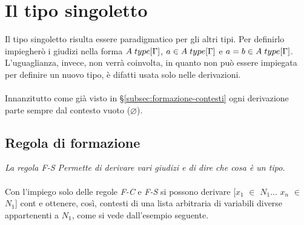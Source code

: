 \documentclass[10pt,a4paper, italian]{book}
\begin{document}
\section{Il tipo singoletto}
\label{sec:tipo-singoletto}
Il tipo singoletto risulta essere paradigmatico per gli altri tipi. Per definirlo impiegher\`o i giudizi nella forma $A\hspace{0.1cm}type[\Gamma]$, $a \in A\hspace{0.1cm}type[\Gamma]$ e $a = b \in A\hspace{0.1cm}type[\Gamma]$. L'uguaglianza, invece, non verr\`a coinvolta, in quanto non pu\`o essere impiegata per definire un nuovo tipo, \`e difatti usata solo nelle derivazioni.\\\\
Innanzitutto come gi\`a visto in \S\ref{subsec:formazione-contesti} ogni derivazione parte sempre dal contesto vuoto ($\varnothing$).
\begin{prooftree}
\end{prooftree}

\subsection{Regola di formazione}
\label{subsec:formazione}
\begin{prooftree}
\end{prooftree}
\textit{La regola F-S Permette di derivare vari giudizi e di dire che cosa \`e un tipo.}\\\\
Con l'impiego solo delle regole \textit{F-C} e \textit{F-S} si possono derivare [$x_1$ $\in$ $N_1$... $x_n$ $\in$ $N_1$] cont e ottenere, cos\`i, contesti di una lista arbitraria di variabili diverse appartenenti a $N_1$, come si vede dall'esempio seguente.
\begin{prooftree}
\end{prooftree}
\end{document}
